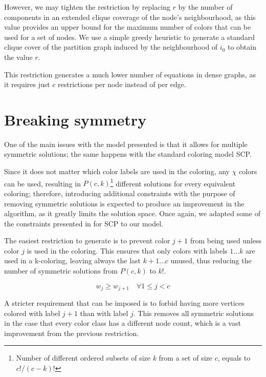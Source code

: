 However, we may tighten the restriction by replacing $r$ by the number of components in an extended clique coverage of the node's neighbourhood, as this value provides an upper bound for the maximum number of colors that can be used for a set of nodes. We use a simple greedy heuristic to generate a standard clique cover of the partition graph induced by the neighbourhood of $i_0$ to obtain the value $r$.

This restriction generates a much lower number of equations in dense graphs, as it requires just $c$ restrictions per node instead of per edge.

\section{Breaking symmetry}
\label{subsec:model:symmetry}

One of the main issues with the model presented is that it allows for multiple symmetric solutions; the same happens with the standard coloring model SCP. 

Since it does not matter which color labels are used in the coloring, any $\chi$ colors can be used, resulting in $P(c,k)$\footnote{Number of different ordered subsets of size $k$ from a set of size $c$, equals to $c! / (c - k)!$} different solutions for every equivalent coloring; therefore, introducing additional constraints with the purpose of removing symmetric solutions is expected to produce an improvement in the algorithm, as it greatly limits the solution space. Once again, we adapted some of the constraints presented in \cite{mendez2008cutting} for SCP to our model.

The easiest restriction to generate is to prevent color $j+1$ from being used unless color $j$ is used in the coloring. This ensures that only colors with labels $1 \ldots k$ are used in a k-coloring, leaving always the last $k+1 \ldots c$ unused, thus reducing the number of symmetric solutions from $P(c,k)$ to $k!$.

\begin{equation}
\label{eqn:lowerlabel}
w_j \geq w_{j+1} \quad \forall 1 \leq j < c 
\end{equation}

A stricter requirement that can be imposed is to forbid having more vertices colored with label $j+1$ than with label $j$. This removes all symmetric solutions in the case that every color class has a different node count, which is a vast improvement from the previous restriction.

